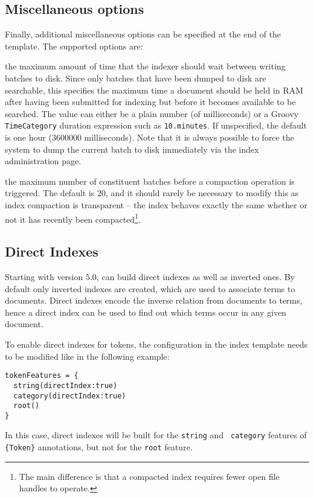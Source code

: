 \subsection*{Miscellaneous options}
Finally, additional miscellaneous options can be specified at the end of the
template.  The supported options are:
\bde
\item[timeBetweenBatches] the maximum amount of time that the indexer should
  wait between writing batches to disk.  Since only batches that have been
  dumped to disk are searchable, this specifies the maximum time a document
  should be held in RAM after having been submitted for indexing but before it
  becomes available to be searched.  The value can either be a plain number (of
  milliseconds) or a Groovy \lstinline!TimeCategory! duration expression such
  as \lstinline!10.minutes!.  If unspecified, the default is one hour (3600000
  milliseconds).  Note that it is always possible to force the system to dump
  the current batch to disk immediately via the index administration page.
\item[maximumBatches] the maximum number of constituent batches before a
  compaction operation is triggered.  The default is 20, and it should rarely
  be necessary to modify this as index compaction is transparent -- the index
  behaves exactly the same whether or not it has recently been
  compacted\footnote{The main difference is that a compacted index requires
  fewer open file handles to operate.}.
\ede

\subsection*{Direct Indexes}
\label{sec:direct-indexes}
Starting with version $5.0$, \Mimir{} can build direct indexes as well as
inverted ones. By default only inverted indexes are created, which are used to associate
terms to documents. Direct indexes encode the inverse relation from documents to
terms, hence a direct index can be used to find out which terms occur in any
given document.

To enable direct indexes for tokens, the configuration in the index template
needs to be modified like in the following example:
\begin{lstlisting}
tokenFeatures = {
  string(directIndex:true)
  category(directIndex:true)
  root()
}
\end{lstlisting}

In this case, direct indexes will be built for the {\tt string} and {\tt
category} features of \verb!{Token}! annotations, but not for the {\tt root}
feature.

